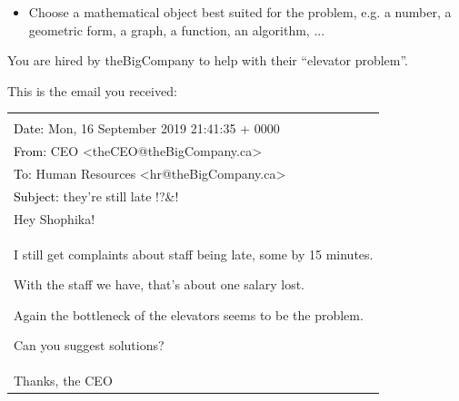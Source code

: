 \begin{annotation}
	\begin{goals}
		\begin{itemize}
			\item Choose a mathematical object best suited for the problem, e.g. a number, a geometric form, a graph, a function, an algorithm, ...

		\end{itemize}
	\end{goals}
%		
%
\end{annotation}


You are hired by theBigCompany to help with their ``elevator problem''.

This is the email you received:

\begin{center}
	\color{blue}
	\begin{tabular}{l}
	\begin{minipage}{.75\textwidth}
	-------- Forwarded Message -------- \\[10pt]
	\textcolor{black}{Date: } Mon, 16 September 2019 21:41:35 + 0000  \\
	\textcolor{black}{From: } CEO <theCEO@theBigCompany.ca> \\
	\textcolor{black}{To: } Human Resources <hr@theBigCompany.ca> \\
	\textcolor{black}{Subject: } they're still late !?\@\&! \\
	
	Hey Shophika! \\
	
	I still get complaints about staff being late, some by 15 minutes.
	
	With the staff we have, that's about one salary lost.
	
	Again the bottleneck of the elevators seems to be the problem.
	
	Can you suggest solutions? \\
	
	Thanks, the CEO
	\end{minipage}
	\end{tabular}
\end{center}


